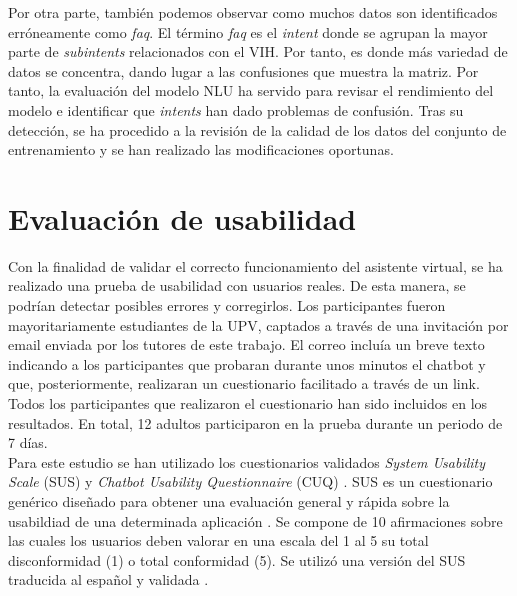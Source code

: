 Por otra parte, también podemos observar como muchos datos son identificados erróneamente como \textit{faq}. El término \textit{faq} es el \textit{intent} donde se agrupan la mayor parte de \textit{subintents} relacionados con el VIH. Por tanto, es donde más variedad de datos se concentra, dando lugar a las confusiones que muestra la matriz. Por tanto, la evaluación del modelo NLU ha servido para revisar el rendimiento del modelo e identificar que \textit{intents} han dado problemas de confusión. Tras su detección, se ha procedido a la revisión de la calidad de los datos del conjunto de entrenamiento y se han realizado las modificaciones oportunas.\\


\section{Evaluación de usabilidad}
Con la finalidad de validar el correcto funcionamiento del asistente virtual, se ha realizado una prueba de usabilidad con usuarios reales. De esta manera, se podrían detectar posibles errores y corregirlos. Los participantes fueron mayoritariamente estudiantes de la UPV, captados a través de una invitación por email enviada por los tutores de este trabajo. El correo incluía un breve texto indicando a los participantes que probaran durante unos minutos el chatbot y que, posteriormente, realizaran un cuestionario facilitado a través de un link. Todos los participantes que realizaron el cuestionario han sido incluidos en los resultados. En total, 12 adultos participaron en la prueba durante un periodo de 7 días.\\

Para este estudio se han utilizado los cuestionarios validados \textit{System Usability Scale} (SUS) \cite{dirtySUS} y \textit{Chatbot Usability Questionnaire} (CUQ) \cite{cuq}. SUS es un cuestionario genérico diseñado para obtener una evaluación general y rápida sobre la usabildiad de una determinada aplicación \cite{dirtySUS}. Se compone de 10 afirmaciones sobre las cuales los usuarios deben valorar en una escala del 1 al 5 su total disconformidad (1) o total conformidad (5). Se utilizó una versión del SUS traducida al español y validada \cite{spanishSUS}.\\

